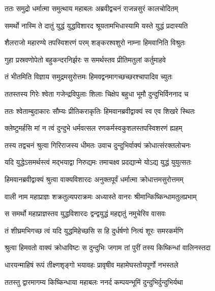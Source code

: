 \twolineshloka
{ततः समुद्रो धर्मात्मा समुत्थाय महाबलः}
{अब्रवीद्वचनं राजन्नसुरं कालचोदितम्} %

\twolineshloka
{समर्थो नास्मि ते दातुं युद्धं युद्धविशारद}
{श्रूयतामभिधास्यामि यस्ते युद्धं प्रदास्यति} %

\twolineshloka
{शैलराजो महारण्ये तपस्विशरणं परम्}
{शङ्करश्वशुरो नाम्ना हिमवानिति विश्रुतः} %

\twolineshloka
{गुहा प्रस्रवणोपेतो बहुकन्दरनिर्झरः}
{स समर्थस्तव प्रीतिमतुलां कर्तुमाहवे} %

\twolineshloka
{तं भीतमिति विज्ञाय समुद्रमसुरोत्तमः}
{हिमवद्वनमागच्छच्छरश्चापादिव च्युतः} %

\twolineshloka
{ततस्तस्य गिरेः श्वेता गजेन्द्रविपुलाः शिलाः}
{चिक्षेप बहुधा भूमौ दुन्दुभिर्विननाद च} %

\twolineshloka
{ततः श्वेताम्बुदाकारः सौम्यः प्रीतिकराकृतिः}
{हिमवानब्रवीद्वाक्यं स्व एव शिखरे स्थितः} %

\twolineshloka
{क्लेष्टुमर्हसि मां न त्वं दुन्दुभे धर्मवत्सल}
{रणकर्मस्वकुशलस्तपस्विशरणं ह्यहम्} %

\twolineshloka
{तस्य तद्वचनं श्रुत्वा गिरिराजस्य धीमतः}
{उवाच दुन्दुभिर्वाक्यं क्रोधात्संरक्तलोचनः} %

\twolineshloka
{यदि युद्धेऽसमर्थस्त्वं मद्भयाद्वा निरुद्यमः}
{तमाचक्ष्व प्रदद्यान्मे योऽद्य युद्धं युयुत्सतः} %

\twolineshloka
{हिमवानब्रवीद्वाक्यं श्रुत्वा वाक्यविशारदः}
{अनुक्तपूर्वं धर्मात्मा क्रोधात्तमसुरोत्तमम्} %

\twolineshloka
{वाली नाम महाप्राज्ञः शक्रतुल्यपराक्रमः}
{अध्यास्ते वानरः श्रीमान्किष्किन्धामतुलप्रभाम्} %

\twolineshloka
{स समर्थो महाप्राज्ञस्तव युद्धविशारदः}
{द्वन्द्वयुद्धं महद्दातुं नमुचेरिव वासवः} %

\twolineshloka
{तं शीघ्रमभिगच्छ त्वं यदि युद्धमिहेच्छसि}
{स हि दुर्धर्षणो नित्यं शूरः समरकर्मणि} %

\twolineshloka
{श्रुत्वा हिमवतो वाक्यं क्रोधाविष्टः स दुन्दुभिः}
{जगाम तां पुरीं तस्य किष्किन्धां वालिनस्तदा} %

\twolineshloka
{धारयन्माहिषं रूपं तीक्ष्णशृङ्गो भयावहः}
{प्रावृषीव महामेघस्तोयपूर्णो नभस्तले} %

\twolineshloka
{ततस्तु द्वारमागम्य किष्किन्धाया महाबलः}
{ननर्द कम्पयन्भूमिं दुन्दुभिर्दुन्दुभिर्यथा} %

